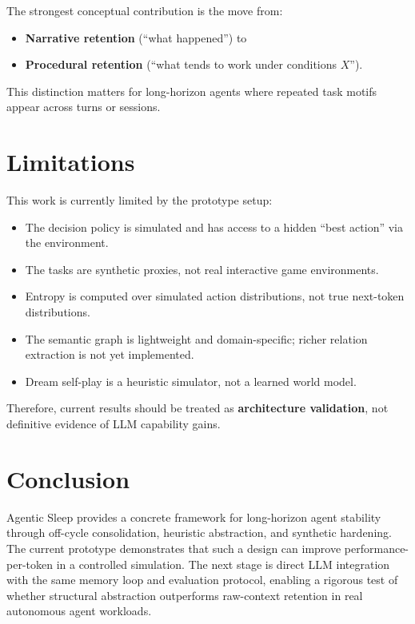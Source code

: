 \documentclass{article}
\begin{document}
The strongest conceptual contribution is the move from:
\begin{itemize}[leftmargin=1.25em]
\item \textbf{Narrative retention} (``what happened'') to
\item \textbf{Procedural retention} (``what tends to work under conditions $X$'').
\end{itemize}

This distinction matters for long-horizon agents where repeated task motifs appear across turns or sessions.

\section{Limitations}

This work is currently limited by the prototype setup:

\begin{itemize}[leftmargin=1.25em]
\item The decision policy is simulated and has access to a hidden ``best action'' via the environment.
\item The tasks are synthetic proxies, not real interactive game environments.
\item Entropy is computed over simulated action distributions, not true next-token distributions.
\item The semantic graph is lightweight and domain-specific; richer relation extraction is not yet implemented.
\item Dream self-play is a heuristic simulator, not a learned world model.
\end{itemize}

Therefore, current results should be treated as \textbf{architecture validation}, not definitive evidence of LLM capability gains.

\section{Conclusion}

Agentic Sleep provides a concrete framework for long-horizon agent stability through off-cycle consolidation, heuristic abstraction, and synthetic hardening. The current prototype demonstrates that such a design can improve performance-per-token in a controlled simulation. The next stage is direct LLM integration with the same memory loop and evaluation protocol, enabling a rigorous test of whether structural abstraction outperforms raw-context retention in real autonomous agent workloads.
\end{document}
